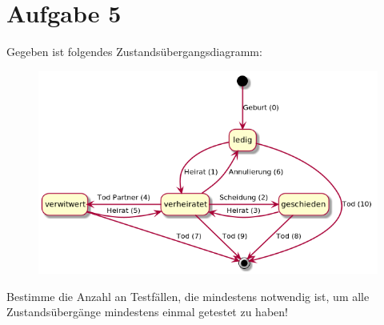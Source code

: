 \newpage
\section*{Aufgabe 5}

Gegeben ist folgendes Zustandsübergangsdiagramm:

\begin{center}
\begin{figure}[ht]
  \centering
  \includegraphics[width=\textwidth]{beziehungen.png}
\end{figure}
\end{center}

Bestimme die Anzahl an Testfällen, die mindestens notwendig ist, um alle Zustandsübergänge mindestens einmal getestet zu haben!

